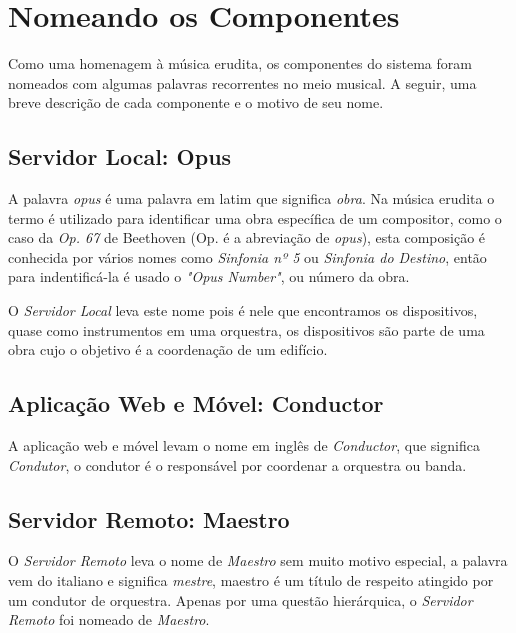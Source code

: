 \section{Nomeando os Componentes}
\label{sec:nomeando-componentes}

Como uma homenagem à música erudita, os componentes do sistema foram nomeados
com algumas palavras recorrentes no meio musical. A seguir, uma breve descrição
de cada componente e o motivo de seu nome.

\subsection{Servidor Local: \textbf{Opus}}
A palavra \emph{opus} é uma palavra em latim que significa \emph{obra}. Na música
erudita o termo é utilizado para identificar uma obra específica de um compositor, 
como o caso da \emph{Op. 67} de Beethoven (Op. é a abreviação de \emph{opus}), esta
composição é conhecida por vários nomes como \emph{Sinfonia nº 5} ou 
\emph{Sinfonia do Destino}, então para indentificá-la é usado o \emph{"Opus Number"}, 
ou número da obra.

O \emph{Servidor Local} leva este nome pois é nele que encontramos os dispositivos,
quase como instrumentos em uma orquestra, os dispositivos são parte de uma obra cujo
o objetivo é a coordenação de um edifício.

\subsection{Aplicação Web e Móvel: \textbf{Conductor}}
A aplicação web e móvel levam o nome em inglês de \emph{Conductor}, que significa
\emph{Condutor}, o condutor é o responsável por coordenar a orquestra ou banda.

\subsection{Servidor Remoto: \textbf{Maestro}}
O \emph{Servidor Remoto} leva o nome de \emph{Maestro} sem muito motivo especial,
a palavra vem do italiano e significa \emph{mestre}, maestro é um título de respeito 
atingido por um condutor de orquestra. Apenas por uma questão hierárquica,
o \emph{Servidor Remoto} foi nomeado de \emph{Maestro}.